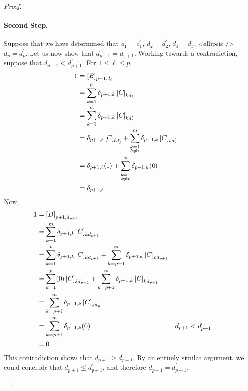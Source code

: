 \documentclass{ximera}
\begin{document}
\begin{theorem}
\begin{proof}
\begin{expandable}
\paragraph*{Second Step.}  Suppose that we have determined that $d_1=d^\prime_1$, $d_2=d^\prime_2$, $d_3=d^\prime_3$, <ellipsis /> $d_p=d^\prime_p$.  Let us now show that $d_{p+1}=d^\prime_{p+1}$.  Working towards a contradiction, suppose that $d_{p+1}<d^\prime_{p+1}$.  For $1\leq\ell\leq p$,
\begin{align*}
0
&=\left\lbrack B\right\rbrack_{p+1,d_\ell}
\\
&=\sum_{k=1}^{m}\delta_{p+1,k}\left\lbrack C\right\rbrack_{kd_\ell}\\
&=\sum_{k=1}^{m}\delta_{p+1,k}\left\lbrack C\right\rbrack_{kd^\prime_\ell}\\
&=
\delta_{p+1,\ell}\left\lbrack C\right\rbrack_{\ell d^\prime_\ell}+
\sum_{\substack{k=1\\k\neq\ell}}^{m}\delta_{p+1,k}\left\lbrack C\right\rbrack_{kd^\prime_\ell}
\\
&=
\delta_{p+1,\ell}(1)+
\sum_{\substack{k=1\\k\neq\ell}}^{m}\delta_{p+1,k}(0)
\\
&=\delta_{p+1,\ell}
\end{align*}
Now,
\begin{align*}
1
&=\left\lbrack B\right\rbrack_{p+1,d_{p+1}}\\
&=\sum_{k=1}^{m}\delta_{p+1,k}\left\lbrack C\right\rbrack_{kd_{p+1}}\\
&=
\sum_{k=1}^{p}\delta_{p+1,k}\left\lbrack C\right\rbrack_{kd_{p+1}}+
\sum_{k=p+1}^{m}\delta_{p+1,k}\left\lbrack C\right\rbrack_{kd_{p+1}}\\
&=
\sum_{k=1}^{p}(0)\left\lbrack C\right\rbrack_{kd_{p+1}}+
\sum_{k=p+1}^{m}\delta_{p+1,k}\left\lbrack C\right\rbrack_{kd_{p+1}}\\
&=\sum_{k=p+1}^{m}\delta_{p+1,k}\left\lbrack C\right\rbrack_{kd_{p+1}}\\
&=\sum_{k=p+1}^{m}\delta_{p+1,k}(0)
&&d_{p+1}<d^\prime_{p+1}\\
&=0
\end{align*}
This contradiction shows that
$d_{p+1}\geq d^\prime_{p+1}$.  By an entirely similar argument, we could conclude that $d_{p+1}\leq d^\prime_{p+1}$, and therefore $d_{p+1}=d^\prime_{p+1}$.


\end{expandable}
\end{proof}
\end{theorem}
\end{document}
